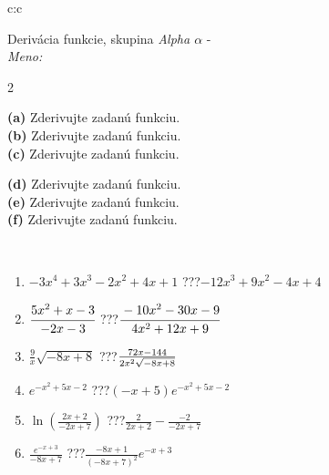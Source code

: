 \documentclass[10pt]{report}
\begin{document}
\thispagestyle{empty}
\begin{tabular}{c:c}
\begin{minipage}[c][104.5mm][t]{0.5\linewidth}
\begin{center}
\vspace{7mm}
{\huge Derivácia funkcie, skupina \textit{Alpha $\alpha$} -}\\[5mm]
\textit{Meno:}\phantom{xxxxxxxxxxxxxxxxxxxxxxxxxxxxxxxxxxxxxxxxxxxxxxxxxxxxxxxxxxxxxxxxx}\\[5mm]
\begin{minipage}{0.95\linewidth}
\begin{center}
{\small \begin{multicols}{2} \raggedright
\textbf{(a)} Zderivujte zadanú funkciu. \\[1mm]
\textbf{(b)} Zderivujte zadanú funkciu. \\[1mm]
\textbf{(c)} Zderivujte zadanú funkciu. \par \columnbreak
\textbf{(d)} Zderivujte zadanú funkciu. \\[1mm]
\textbf{(e)} Zderivujte zadanú funkciu. \\[1mm]
\textbf{(f)} Zderivujte zadanú funkciu.
\end{multicols}
}
\end{center}
\end{minipage}
\\[4mm]
\begin{minipage}{0.79\linewidth}
\begin{center}
\begin{varwidth}{\linewidth}
\begin{enumerate}
\normalsize
\item $-3x^4+3x^3-2x^2+4x+1$\quad \dotfill\; ???\;\dotfill \quad $-12x^3+9x^2-4x+4$
\item $\cfrac{5x^2+x-3}{-2x-3}$\quad \dotfill\; ???\;\dotfill \quad $\cfrac{-10x^2-30x-9}{4x^2+12x+9}$
\item $\frac{9}{x}\sqrt{-8x+8}$\quad \dotfill\; ???\;\dotfill \quad $\frac{72x-144}{2x^2 \sqrt{\smash[b]{-8x+8}}}$
\item $e^{-x^2+5x-2}$\quad \dotfill\; ???\;\dotfill \quad $(-x+5)e^{-x^2+5x-2}$
\item $\ln{\left(\frac{2x+2}{-2x+7}\right)}$\quad \dotfill\; ???\;\dotfill \quad $\frac{2}{2x+2}-\frac{-2}{-2x+7}$
\item $\frac{e^{-x+3}}{-8x+7}$\quad \dotfill\; ???\;\dotfill \quad $\frac{-8x+1}{(-8x+7)^2}e^{-x+3}$
\end{enumerate}

\end{varwidth}
\end{center}
\end{minipage}
\end{center}
\end{minipage}
\end{tabular}
\end{document}
